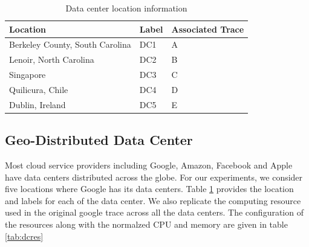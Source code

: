 \documentclass[letterpaper,twocolumn,12pt]{article}
\begin{document}
\begin{table}[] 
 \centering
\begin{tabular}{|p{3cm}|l|p{2.5cm}|}
\hline
\bf{Location}                        & \bf{Label} & \bf{Associated Trace} \\ \hline
Berkeley County, South Carolina & DC1   & A                \\ \hline
Lenoir, North Carolina          & DC2   & B                \\ \hline
Singapore                       & DC3   & C                \\ \hline
Quilicura, Chile                & DC4   & D                \\ \hline
Dublin, Ireland                 & DC5   &   E               \\ \hline
\end{tabular}
\caption {Data center location information} \label{tab:dc}
\end{table}

\subsection{Geo-Distributed Data Center}
Most cloud service providers including Google, Amazon, Facebook and Apple have data centers distributed across the globe. For our experiments, we consider five locations where Google has its data centers\cite{googletracedata}. Table \ref{tab:dc} provides the location and labels for each of the data center. We also replicate the computing resource used in the original google trace across all the data centers. The configuration of the resources along with the normalzed CPU and memory are given in table \ref{tab:dcres}

\begin{table}[] 
 \centering
{}
\caption {Data center IT resource configuration} \label{tab:dcres}
\end{table}
\end{document}
